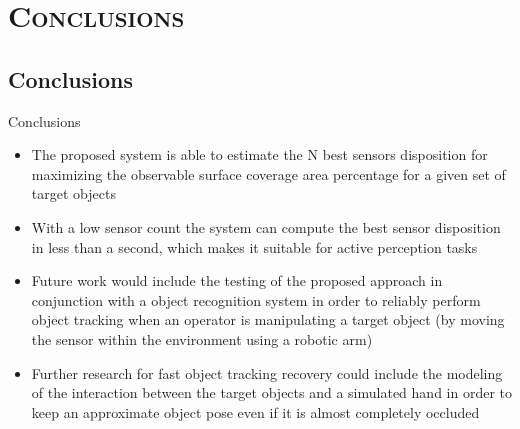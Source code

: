 \section{\scshape Conclusions}
\subsection*{Conclusions}
\begin{frame}{Conclusions}
	\begin{itemize}
		\item The proposed system is able to estimate the N best sensors disposition for maximizing the observable surface coverage area percentage for a given set of target objects
		\item With a low sensor count the system can compute the best sensor disposition in less than a second, which makes it suitable for active perception tasks
		\item Future work would include the testing of the proposed approach in conjunction with a object recognition system in order to reliably perform object tracking when an operator is manipulating a target object (by moving the sensor within the environment using a robotic arm)
		\item Further research for fast object tracking recovery could include the modeling of the interaction between the target objects and a simulated hand in order to keep an approximate object pose even if it is almost completely occluded
	\end{itemize}
\end{frame}